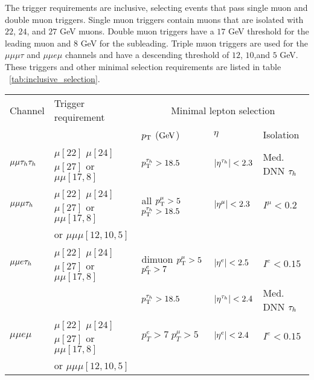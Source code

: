The trigger requirements are inclusive, selecting events that pass single muon and double muon triggers. Single muon triggers contain muons that are isolated with $22$, $24$, and $27$ GeV muons. Double muon triggers have a $17$ GeV threshold for the leading muon and $8$ GeV for the subleading. Triple muon triggers are used for the $\mu\mu\mu\tau$ and $\mu\mu e \mu$ channels and have a descending threshold of $12$, $10$,and $5$ GeV. These triggers and other minimal selection requirements are listed in table ~\ref{tab:inclusive_selection}.


\begin{table}[h!tbp]
\centering
{}
\begin{tabular}{lllll}
  Channel     &  Trigger requirement                      & \multicolumn{3}{c}{Minimal lepton selection}                        \\ \cline{3-5}
              &                                            & $p_{\mathrm{T}}$ ($\text{Ge\hspace{-.08em}V}{}$)  & $\eta$                    &    Isolation      \\
\hline
$\mu\mu\tau_h\tau_h$  &  $\mu[22]$ $\mu[24]$  $\mu[27]$   or  $\mu\mu[17,8]$       & $p_{\mathrm{T}}^{\tau_h}>18.5$    & $\lvert \eta^{\tau_h} \rvert<2.3$  &   Med. DNN $\tau_h$   \\

$\mu\mu\mu\tau_h$    &  $\mu[22]$ $\mu[24]$  $\mu[27]$   or  $\mu\mu[17,8]$                     & all $p_{\mathrm{T}}^\mu>5$ $p_{\mathrm{T}}^{\tau_h}>18.5$      &  $\lvert \eta^\mu \rvert<2.3$    &   $I^{\mu}<0.2$ \\

& or  $\mu\mu\mu[12,10,5]$  &  & & \\ 

$\mu\mu e \tau_h$    &$\mu[22]$ $\mu[24]$  $\mu[27]$   or  $\mu\mu[17,8]$                         & dimuon  $p_{\mathrm{T}}^\mu>5$ $p_{\mathrm{T}}^e>7$      &  $\lvert \eta^e \rvert<2.5$     &   $I^{e}<0.15$  \\
              &                          & $p_{\mathrm{T}}^{\tau_h}>18.5$    &  $\lvert \eta^{\tau_h} \rvert<2.4$ &   Med. DNN $\tau_h$   \\

$\mu\mu e \mu $     & $\mu[22]$ $\mu[24]$  $\mu[27]$   or  $\mu\mu[17,8]$       & $p_T^e >7\; p_T^\mu >5$      & $\lvert \eta^e \rvert<2.4$      & $I^{e}<0.15$    \\
& or  $\mu\mu\mu[12,10,5]$  &  & & \\ 

\hline
\end{tabular}
\end{table}

